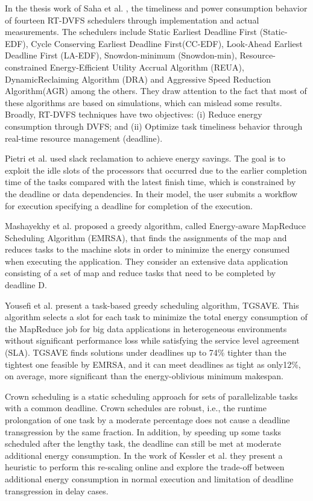 In the thesis work of Saha et al. \cite{Saha2012}, the timeliness and power consumption behavior of fourteen RT-DVFS schedulers through implementation and actual measurements. The schedulers include Static Earliest Deadline First (Static-EDF), Cycle Conserving Earliest Deadline First(CC-EDF), Look-Ahead Earliest Deadline First (LA-EDF), Snowdon-minimum (Snowdon-min), Resource-constrained Energy-Efficient Utility Accrual Algorithm (REUA), DynamicReclaiming Algorithm (DRA) and Aggressive Speed Reduction Algorithm(AGR) among the others. They draw attention to the fact that most of these algorithms are based on simulations, which can mislead some results. Broadly, RT-DVFS techniques have two objectives: (i) Reduce energy consumption through DVFS; and (ii) Optimize task timeliness behavior through real-time resource management (deadline).

Pietri et al. \cite{Pietri2014} used slack reclamation to achieve energy savings. The goal is to exploit the idle slots of the processors that occurred due to the earlier completion time of the tasks compared with the latest finish time, which is constrained by the deadline or data dependencies. In their model, the user submits a workflow for execution specifying a deadline for completion of the execution.

Mashayekhy et al. \cite{Mashayekhy2014} proposed a greedy algorithm, called Energy-aware  MapReduce  Scheduling  Algorithm  (EMRSA), that finds the assignments of the map and reduces tasks to the machine slots in order to minimize the energy consumed when executing the application. They consider an extensive data application consisting of a set of map and reduce tasks that need to be completed by deadline D.

Yousefi et al. \cite{Yousefi2018}  present a task-based greedy scheduling algorithm, TGSAVE. This algorithm selects a slot for each task to minimize the total energy consumption of the MapReduce job for big data applications in heterogeneous environments without significant performance loss while satisfying the service level agreement (SLA). TGSAVE  finds solutions under deadlines up to 74\% tighter than the tightest one feasible by EMRSA, and it can meet deadlines as tight as only12\%, on average, more significant than the energy-oblivious minimum makespan.

Crown scheduling is a static scheduling approach for sets of parallelizable tasks with a common deadline. Crown schedules are robust, i.e., the runtime prolongation of one task by a moderate percentage does not cause a deadline transgression by the same fraction. In addition, by speeding up some tasks scheduled after the lengthy task, the deadline can still be met at moderate additional energy consumption. In the work of Kessler et al. \cite{Kessler2021} they present a heuristic to perform this re-scaling online and explore the trade-off between additional energy consumption in normal execution and limitation of deadline transgression in delay cases.

